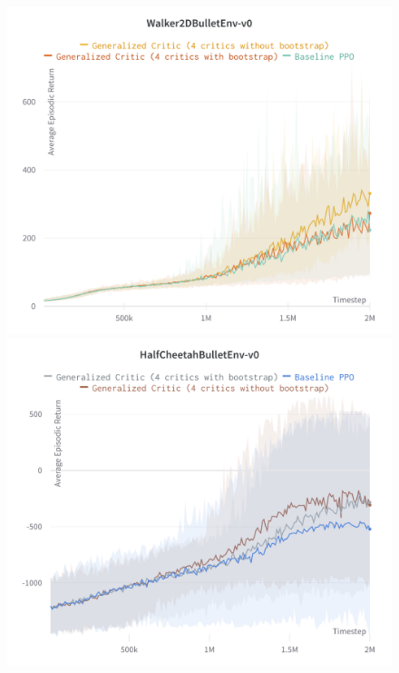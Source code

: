 \begin{figure}[!htb]
\begin{minipage}[b]{.5\linewidth}
  \centering
  \centerline{\includegraphics[width=\linewidth]{images/walker2D}}
\end{minipage}
\begin{minipage}[b]{.5\linewidth}
  \centering
  \centerline{\includegraphics[width=\linewidth]{images/halfcheetah}}
\end{minipage}


\end{figure}
